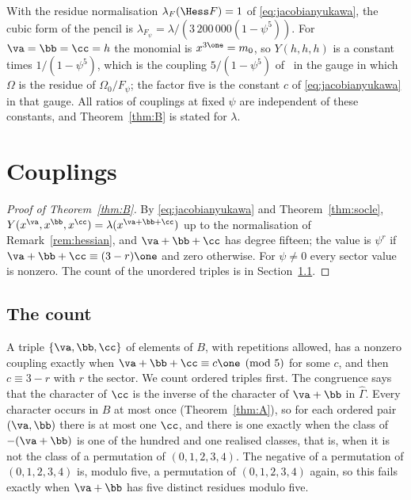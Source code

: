 \begin{remark}[Normalisation]\label{rem:hessian}
With the residue normalisation $\lambda_{F}(\Hess F)=1$ of
\eqref{eq:jacobianyukawa}, the cubic form of the pencil is
$\lambda_{F_\psi}=\lambda/(3\,200\,000(1-\psi^5))$. For $\va=\bb=\cc=h$ the
monomial is $x^{3\one}=m_0$, so $Y(h,h,h)$ is a constant times
$1/(1-\psi^5)$, which is the coupling $5/(1-\psi^5)$ of~\cite{CDGP91} in
the gauge in which $\Omega$ is the residue of $\Omega_0/F_\psi$; the
factor five is the constant $c$ of \eqref{eq:jacobianyukawa} in that gauge.
All ratios of couplings at fixed $\psi$ are independent of these
constants, and Theorem~\ref{thm:B} is stated for $\lambda$.
\end{remark}

\section{Couplings}\label{sec:couplings}

\begin{proof}[Proof of Theorem~\ref{thm:B}]
By \eqref{eq:jacobianyukawa} and Theorem~\ref{thm:socle},
$Y(x^{\va},x^{\bb},x^{\cc})=\lambda(x^{\va+\bb+\cc})$ up to the
normalisation of Remark~\ref{rem:hessian}, and $\va+\bb+\cc$ has degree
fifteen; the value is $\psi^r$ if $\va+\bb+\cc\equiv(3-r)\one$ and zero
otherwise. For $\psi\ne0$ every sector value is nonzero. The count of the
unordered triples is in Section~\ref{sec:count}.
\end{proof}

\subsection{The count}\label{sec:count}

A triple $\{\va,\bb,\cc\}$ of elements of $B$, with repetitions allowed, has
a nonzero coupling exactly when $\va+\bb+\cc\equiv c\one\pmod5$ for some
$c$, and then $c\equiv3-r$ with $r$ the sector. We count ordered triples
first. The congruence says that the character of $\cc$ is the inverse of the
character of $\va+\bb$ in $\widehat\Gamma$. Every character occurs in $B$ at
most once (Theorem~\ref{thm:A}), so for each ordered pair $(\va,\bb)$ there
is at most one $\cc$, and there is one exactly when the class of
$-(\va+\bb)$ is one of the hundred and one realised classes, that is, when it
is not the class of a permutation of $(0,1,2,3,4)$. The negative of a
permutation of $(0,1,2,3,4)$ is, modulo five, a permutation of
$(0,1,2,3,4)$ again, so this fails exactly when $\va+\bb$ has five distinct
residues modulo five.

